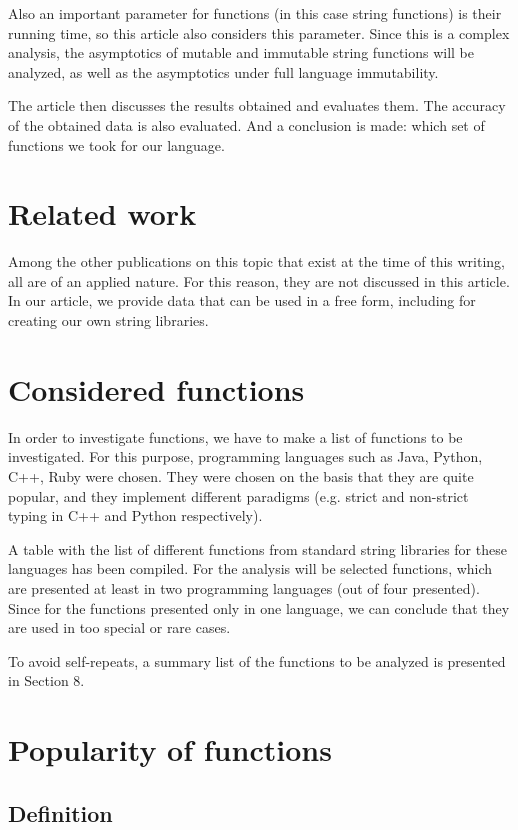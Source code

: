 \documentclass[anonymous,sigplan,review,11pt,nonacm,natbib=false]{acmart}
\begin{document}
    Also an important parameter for functions (in this case string functions) is their running time, so this article also considers this parameter. Since this is a complex analysis, the asymptotics of mutable and immutable string functions will be analyzed, as well as the asymptotics under full language immutability.

    The article then discusses the results obtained and evaluates them. The accuracy of the obtained data is also evaluated. And a conclusion is made: which set of functions we took for our language.

    \section{Related work}

    Among the other publications on this topic that exist at the time of this writing, all are of an applied nature. For this reason, they are not discussed in this article. In our article, we provide data that can be used in a free form, including for creating our own string libraries.

    \section{Considered functions}

    In order to investigate functions, we have to make a list of functions to be investigated. For this purpose, programming languages such as Java, Python, C++, Ruby were chosen. They were chosen on the basis that they are quite popular, and they implement different paradigms (e.g. strict and non-strict typing in C++ and Python respectively).

    A table with the list of different functions from standard string libraries for these languages has been compiled. For the analysis will be selected functions, which are presented at least in two programming languages (out of four presented). Since for the functions presented only in one language, we can conclude that they are used in too special or rare cases.

    To avoid self-repeats, a summary list of the functions to be analyzed is presented in Section 8.

    \section{Popularity of functions}

    \subsection{Definition}
\end{document}
